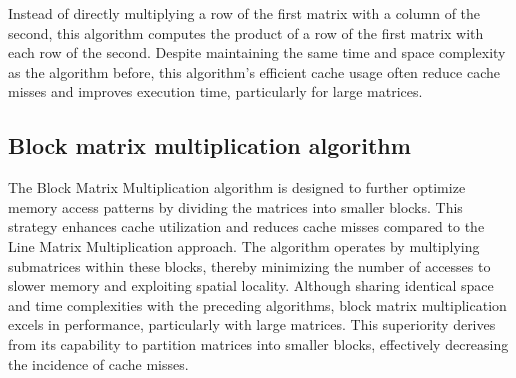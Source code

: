 Instead of directly multiplying a row of the
first matrix with a column of the second, this algorithm
computes the product of a row of the first
matrix with each row of the second. Despite maintaining the same time and space complexity as the algorithm before, this algorithm's
efficient cache usage often reduce cache misses and improves
execution time, particularly for large matrices.


\subsection{Block matrix multiplication algorithm}

The Block Matrix Multiplication algorithm is designed
to further optimize memory access patterns by dividing
the matrices into smaller blocks. This strategy enhances
cache utilization and reduces cache misses compared to the
Line Matrix Multiplication approach. The algorithm operates by
multiplying submatrices
within these blocks, thereby minimizing the number of accesses to slower memory
and exploiting spatial locality. Although
sharing identical space and time complexities with the preceding
algorithms, block matrix multiplication excels in performance,
particularly with large matrices. This superiority derives from its
capability to partition matrices into smaller blocks, effectively
decreasing the incidence of cache misses.